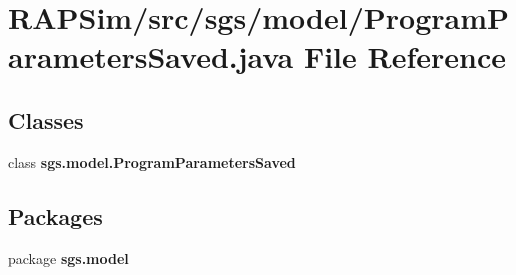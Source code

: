 \section{R\-A\-P\-Sim/src/sgs/model/\-Program\-Parameters\-Saved.java File Reference}
\label{_program_parameters_saved_8java}
\subsection*{Classes}
\begin{DoxyCompactItemize}
\item 
class {\bf sgs.\-model.\-Program\-Parameters\-Saved}
\end{DoxyCompactItemize}
\subsection*{Packages}
\begin{DoxyCompactItemize}
\item 
package {\bf sgs.\-model}
\end{DoxyCompactItemize}
